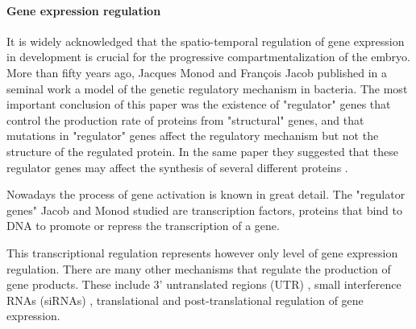 %




\paragraph{Gene expression regulation}

It is widely acknowledged that the spatio-temporal regulation of gene expression in development is crucial for the progressive compartmentalization of the embryo. 
More than fifty years ago, Jacques Monod and Fran\c cois Jacob \citep{Jacob1961} published in a seminal work a model of the genetic regulatory mechanism in bacteria.
The most important conclusion of this paper was the existence of "regulator" genes that control the production rate of proteins from "structural" genes, and that mutations in "regulator" genes affect the regulatory mechanism but not the structure of the regulated protein. In the same paper they suggested that these regulator genes may affect the synthesis of several different proteins \citep{Jacob1961}.

Nowadays the process of gene activation is known in great detail. The  "regulator genes" Jacob and Monod studied are transcription factors, proteins that bind to DNA to promote or repress the transcription of a gene.

This transcriptional regulation represents however only level of gene expression regulation. There are many other mechanisms that regulate the production of gene products. These include 3' untranslated regions (UTR) \citep{Grzybowska2001}, small interference RNAs (siRNAs) \citep{Filipowicz2005}, translational \citep{Kozak1992,Kapp2004} and post-translational \citep{Mann2003} regulation of gene expression.

